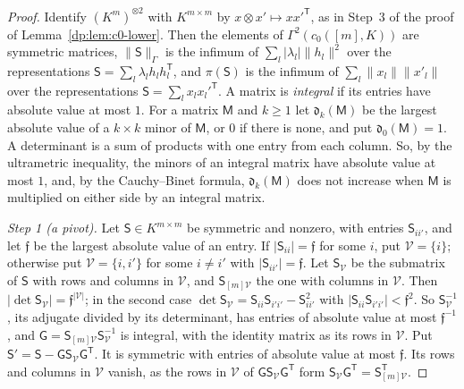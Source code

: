 \documentclass[11pt]{amsart}
\theoremstyle{definition}
\theoremstyle{remark}
\numberwithin{equation}{section}
\newcommand{\abs}[1]{\lvert #1\rvert}
\newcommand{\norm}[1]{\lVert #1\rVert}
\theoremstyle{plain}
\theoremstyle{definition}
\theoremstyle{plain}
\begin{document}
\begin{proof}
Identify $(K^m)^{\otimes2}$ with $K^{m\times m}$ by $x\otimes x'\mapsto xx'^{\mathsf T}$, as in Step~3 of the proof of Lemma~\ref{dp:lem:c0-lower}. Then the elements of $\Gamma^2(c_0([m],K))$ are symmetric matrices, $\norm{\mathsf S}_\Gamma$ is the infimum of $\sum_l\abs{\lambda_l}\norm{h_l}^2$ over the representations $\mathsf S=\sum_l\lambda_lh_lh_l^{\mathsf T}$, and $\pi(\mathsf S)$ is the infimum of $\sum_l\norm{x_l}\norm{x'_l}$ over the representations $\mathsf S=\sum_lx_lx_l'^{\mathsf T}$. A matrix is \emph{integral} if its entries have absolute value at most $1$. For a matrix $\mathsf M$ and $k\ge1$ let $\mathfrak d_k(\mathsf M)$ be the largest absolute value of a $k\times k$ minor of $\mathsf M$, or $0$ if there is none, and put $\mathfrak d_0(\mathsf M)=1$. A determinant is a sum of products with one entry from each column. So, by the ultrametric inequality, the minors of an integral matrix have absolute value at most $1$, and, by the Cauchy--Binet formula, $\mathfrak d_k(\mathsf M)$ does not increase when $\mathsf M$ is multiplied on either side by an integral matrix.

\emph{Step 1 (a pivot).} Let $\mathsf S\in K^{m\times m}$ be symmetric and nonzero, with entries $\mathsf S_{ii'}$, and let $\mathfrak f$ be the largest absolute value of an entry. If $\abs{\mathsf S_{ii}}=\mathfrak f$ for some $i$, put $\mathcal V=\{i\}$; otherwise put $\mathcal V=\{i,i'\}$ for some $i\ne i'$ with $\abs{\mathsf S_{ii'}}=\mathfrak f$. Let $\mathsf S_{\mathcal V}$ be the submatrix of $\mathsf S$ with rows and columns in $\mathcal V$, and $\mathsf S_{[m]\mathcal V}$ the one with columns in $\mathcal V$. Then $\abs{\det\mathsf S_{\mathcal V}}=\mathfrak f^{\abs{\mathcal V}}$; in the second case $\det\mathsf S_{\mathcal V}=\mathsf S_{ii}\mathsf S_{i'i'}-\mathsf S_{ii'}^2$ with $\abs{\mathsf S_{ii}\mathsf S_{i'i'}}<\mathfrak f^2$. So $\mathsf S_{\mathcal V}^{-1}$, its adjugate divided by its determinant, has entries of absolute value at most $\mathfrak f^{-1}$, and $\mathsf G=\mathsf S_{[m]\mathcal V}\mathsf S_{\mathcal V}^{-1}$ is integral, with the identity matrix as its rows in $\mathcal V$. Put $\mathsf S'=\mathsf S-\mathsf G\mathsf S_{\mathcal V}\mathsf G^{\mathsf T}$. It is symmetric with entries of absolute value at most $\mathfrak f$. Its rows and columns in $\mathcal V$ vanish, as the rows in $\mathcal V$ of $\mathsf G\mathsf S_{\mathcal V}\mathsf G^{\mathsf T}$ form $\mathsf S_{\mathcal V}\mathsf G^{\mathsf T}=\mathsf S_{[m]\mathcal V}^{\mathsf T}$.


\end{proof}
\end{document}
